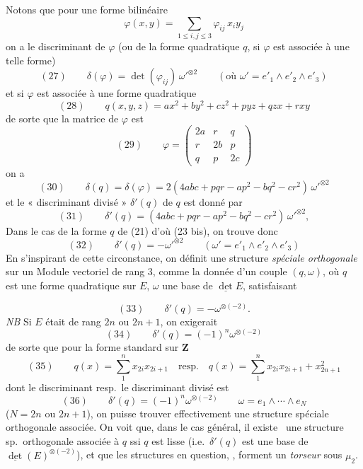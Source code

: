 \documentclass[11pt,a4paper]{article}
\begin{document}
Notons que pour une forme bilinéaire
\[
  \varphi(x, y) = \sum_{1 \leq i, j \leq 3} \varphi_{ij}\, x_i y_j
\]
on a le discriminant de $\varphi$ (ou de la forme quadratique $q$, si $\varphi$ est
associée à une telle forme)
\[
  (27) \qquad \delta(\varphi) = \det(\varphi_{ij})\, \omega'^{\otimes 2} \qquad (\text{où } \omega' = e'_1 \wedge e'_2 \wedge e'_3)
\]
et si $\varphi$ est associée à une forme quadratique
\[
  (28) \qquad q(x, y, z) = ax^2 + by^2 + cz^2 + pyz + qzx + rxy
\]
de sorte que la matrice de $\varphi$ est
\[
  (29) \qquad \varphi = \begin{pmatrix} 2a & r & q \\ r & 2b & p \\ q & p & 2c \end{pmatrix}
\]
on a
\[
  (30) \qquad \delta(q) = \delta(\varphi) = 2(4abc + pqr - ap^2 - bq^2 - cr^2)\, \omega'^{\otimes 2}
\]
et le « discriminant divisé » $\delta'(q)$ de $q$ est donné par
\[
  (31) \qquad \delta'(q) = (4abc + pqr - ap^2 - bq^2 - cr^2)\, \omega'^{\otimes 2} ,
\]
 Dans le cas de la forme $q$ de (21) d'où (23 bis), on trouve donc
\[
  (32) \qquad \delta'(q) = -\omega'^{\otimes 2} \qquad (\omega' = e'_1 \wedge e'_2 \wedge e'_3)
\]
En s'inspirant de cette circonstance, on définit une structure \emph{spéciale
orthogonale} sur un Module  vectoriel de rang 3, comme la
donnée d'un couple $(q, \omega)$, où $q$ est une forme quadratique sur $E$,
$\omega$ une base de $\underline{\det} E$, satisfaisant

\[
  (33) \qquad \delta'(q) = -\omega^{\otimes(-2)} .
\]
\emph{NB} Si $E$ était de rang $2n$ ou $2n+1$, on  exigerait
\[
  (34) \qquad \delta'(q) = (-1)^n \omega^{\otimes(-2)}
\]
de sorte que pour la forme standard sur $\mathbf{Z}$
\[
  (35) \qquad q(x) = \sum_1^n x_{2i} x_{2i+1} \quad \text{resp.} \quad q(x) = \sum_1^n x_{2i} x_{2i+1} + x_{2n+1}^2
\]
dont le discriminant resp.\ le discriminant divisé est
\[
  (36) \qquad \delta'(q) = (-1)^n \omega^{\otimes(-2)} \qquad \omega = e_1 \wedge \cdots \wedge e_N
\]
($N = 2n$ ou $2n+1$), on puisse trouver effectivement une structure spéciale
orthogonale associée. On voit que, dans le cas général, il existe
\ une structure sp.\ orthogonale associée à $q$ ssi $q$ est lisse (i.e.\
$\delta'(q)$ est une base de $\underline{\det}(E)^{\otimes(-2)}$), et que les
structures en question, \ill{} \uncertain{base} \uncertain{variable}, forment un
\emph{torseur} sous $\mu_2$.
\end{document}
